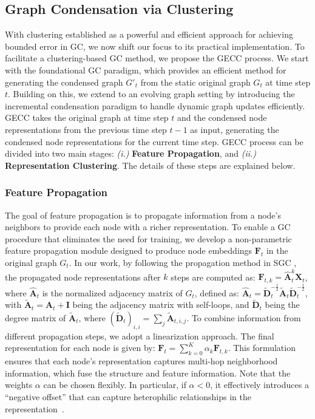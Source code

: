 \subsection{Graph Condensation via Clustering}\label{sec:clustering}
With clustering established as a powerful and efficient approach for achieving bounded error in GC, we now shift our focus to its practical implementation. To facilitate a clustering-based GC method, we propose the GECC process. We start with the foundational GC paradigm, which provides an efficient method for generating the condensed graph \(G'_t\) from the static original graph \(G_t\) at time step $t$. Building on this, we extend to an evolving graph setting by introducing the incremental condensation paradigm to handle dynamic graph updates efficiently. GECC takes the original graph at time step \( t \) and the condensed node representations from the previous time step \( t-1 \) as input, generating the condensed node representations for the current time step. GECC process can be divided into two main stages: \emph{(i.)} \textbf{Feature Propagation}, and \emph{(ii.)} \textbf{Representation Clustering}. The details of these steps are explained below. 

\subsubsection{Feature Propagation}

The goal of feature propagation is to propagate information from a node's neighbors to provide each node with a richer representation. To enable a GC procedure that eliminates the need for training, we develop a non-parametric feature propagation module \citep{wu2019simplifying,ma2008bringing,maurya2021improving,hamilton2017inductive} designed to produce node embeddings $\mathbf{F}_t$ in the original graph $G_t$. In our work, by following the propagation method in SGC \citep{wu2019simplifying}, the propagated node representations after \( k \) steps are computed as: $\mathbf{F}_{t,k} = \hat{\mathbf{A}}_t^k \mathbf{X}_t$,
where \( \hat{\mathbf{A}}_t \) is the normalized adjacency matrix of \( G_t \), defined as: $\hat{\mathbf{A}}_t = \tilde{\mathbf{D}}_t^{-\frac{1}{2}} \tilde{\mathbf{A}}_t \tilde{\mathbf{D}}_t^{-\frac{1}{2}}$, with \( \tilde{\mathbf{A}}_t = \mathbf{A}_t + \mathbf{I} \) being the adjacency matrix with self-loops, and \( \tilde{\mathbf{D}}_t \) being the degree matrix of \( \tilde{\mathbf{A}}_t \), where \( (\tilde{\mathbf{D}}_t)_{i,i} = \sum_j \tilde{\mathbf{A}}_{t,i,j} \). To combine information from different propagation steps, we adopt a linearization approach. The final representation for each node is given by:
$\mathbf{F}_t = \sum_{k=0}^{K} \alpha_k \mathbf{F}_{t,k} \label{equ:prop}$.
This formulation ensures that each node's representation captures multi-hop neighborhood information, which fuse the structure and feature information. Note that the weights \(\alpha\) can be chosen flexibly. In particular, if \(\alpha < 0\), it effectively introduces a ``negative offset'' that can capture heterophilic relationships in the representation~\cite{zhu2021graphheterophily}.







